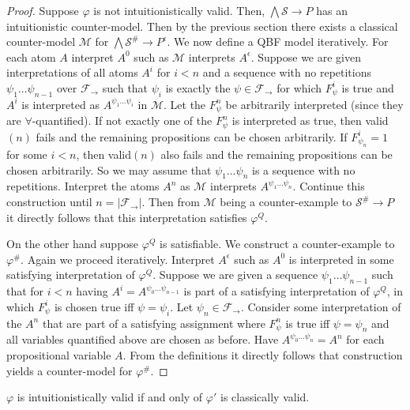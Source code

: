 \documentclass[a4paper,UKenglish,cleveref, autoref, thm-restate]{lipics-v2021}
\begin{document}
\begin{proof}
Suppose $\varphi$ is not intuitionistically valid.
Then, $\bigwedge\mathcal S\to P$ has an intuitionistic counter-model. Then by the previous section there exists a classical counter-model $\mathcal M$ for $\bigwedge\mathcal S^\#\to P^\epsilon$.
We now define a QBF model iteratively.
For each atom $A$ interpret $A^0$ such as $\mathcal M$ interprets $A^\epsilon$. Suppose we are given interpretations of all atoms $A^i$ for $i < n$ and a sequence with no repetitions $\psi_1\dots\psi_{n-1}$ over $\mathcal F_\to$ such that $\psi_i$ is exactly the $\psi\in\mathcal F_\to$ for which $F_{\psi}^i$ is true and $A^i$ is interpreted as $A^{\psi_1\dots\psi_i}$  in $\mathcal M$.
Let the $F^{n}_\psi$ be arbitrarily interpreted (since they are $\forall$-quantified). If not exactly one of the $F^{n}_\psi$ is interpreted as true, then valid$(n)$ fails and the remaining propositions can be chosen arbitrarily. If $F^i_{\psi_n} = 1$ for some $i < n$, then valid$(n)$ also fails and the remaining propositions can be chosen arbitrarily.
So we may assume that $\psi_1\dots\psi_n$ is a sequence with no repetitions.
Interpret the atoms $A^n$ as $\mathcal M$ interprets $A^{\psi_1\dots\psi_n}$.
Continue this construction until $n  = |\mathcal F_\to|$. Then from $\mathcal M$ being a counter-example to $\mathcal S^\#\to P$ it directly follows that this interpretation satisfies $\varphi^Q$.
	
	On the other hand suppose $\varphi^Q$ is satisfiable. We construct a counter-example to $\varphi^\#$.
	Again we proceed iteratively. Interpret $A^\epsilon$ such as $A^0$ is interpreted in some satisfying interpretation of $\varphi^Q$. Suppose we are given a sequence $\psi_1\dots \psi_{n-1}$ such that for $i<n$ having $A^i = A^{\psi_0\dots\psi_{n-1}}$ is part of a satisfying interpretation of $\varphi^Q$, in which $F^i_\psi$ is chosen true iff $\psi = \psi_i$. Let $\psi_n\in\mathcal F_\to$. Consider some interpretation of the $A^n$ that are part of a satisfying assignment where $F^n_\psi$ is true iff $\psi = \psi_n$ and all variables quantified above are chosen as before. Have $A^{\psi_0\dots\psi_n} = A^n$ for each propositional variable $A$. From the definitions it directly follows that construction yields a counter-model for $\varphi^\#$.
\end{proof}

\begin{lemma}\label{lemma:fo-simplification}
	$\varphi$ is intuitionistically valid if and only of $\varphi'$ is classically valid.
\end{lemma}
\end{document}
